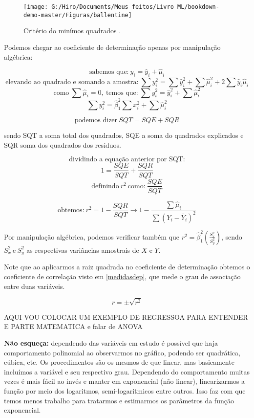 \documentclass[
]{book}
\begin{document}
\begin{figure}

{\centering \texttt{[image: G:/Hiro/Documents/Meus feitos/Livro ML/bookdown-demo-master/Figuras/ballentine]} 

}

\caption{Critério do minímos quadrados \citet{gujarati2011econometria}.}\label{fig:ballentine}
\end{figure}



Podemos chegar ao coeficiente de determinação apenas por manipulação algébrica:

\[\mbox{sabemos que:} \ y_i=\hat{y}_i+\hat{\mu}_i\]
\[\mbox{elevando ao quadrado e somando a amostra:} \ \sum y^2_i=\sum \hat{y}^2_i+\sum \hat{\mu}^2_i+2\sum \hat{y}_i \hat{\mu}_i \]
\[\mbox{como} \ \sum \hat{\mu}_i=0, \ \mbox{temos que:}\ \sum y^2_i= \hat{y}^2_i+\sum \hat{\mu}^2_i \]
\[\sum y^2_i=\hat{\beta}^2_1 \sum x_i^2+\sum \hat{\mu}^2_i \]

\begin{equation}
    \mbox{podemos dizer} \ SQT=SQE+SQR
    \label{eq:sqt}
\end{equation}

sendo SQT a soma total dos quadrados, SQE a soma do quadrados explicados e SQR soma dos quadrados dos resíduos.

\[\mbox{dividindo a equação anterior por SQT:}\]
\[1=\frac{SQE}{SQT}+\frac{SQR}{SQT} \]
\[\mbox{definindo}\ r^2 \ \mbox{como:} \ \frac{SQE}{SQT} \]

\begin{equation}
    \mbox{obtemos:} \ r^2=1-\frac{SQR}{SQT} \rightarrow 1 - \frac{\sum \hat{\mu}_i}{\sum (Y_i - \overline{Y}_i)^2}
    \label{eq:coefdet}
\end{equation}

Por manipulação algébrica, podemos verificar também que \(r^2=\hat{\beta}^2_1(\frac{S^2_x}{S^2_y})\), sendo \(S^2_x\ \mbox{e} \ S^2_y\) as respectivas variâncias amostrais de \(X\) e \(Y\).

Note que ao aplicarmos a raiz quadrada no coeficiente de determinação obtemos o coeficiente de correlação visto em \ref{medidasdep}, que mede o grau de associação entre duas variáveis.

\[r=\pm \sqrt{r^2}\]

AQUI VOU COLOCAR UM EXEMPLO DE REGRESSOA PARA ENTENDER E PARTE MATEMATICA e falar de ANOVA

\textbf{Não esqueça:} dependendo das variáveis em estudo é possível que haja comportamento polinomial ao observarmos no gráfico, podendo ser quadrática, cúbica, etc. Os procedimentos são os mesmos de que linear, mas basicamente incluímos a variável e seu respectivo grau. Dependendo do comportamento muitas vezes é mais fácil ao invés e manter em exponencial (não linear), linearizarmos a função por meio dos logaritmos, semi-logaritmicos entre outros. Isso faz com que temos menos trabalho para tratarmos e estimarmos os parâmetros da função exponencial.
\end{document}
